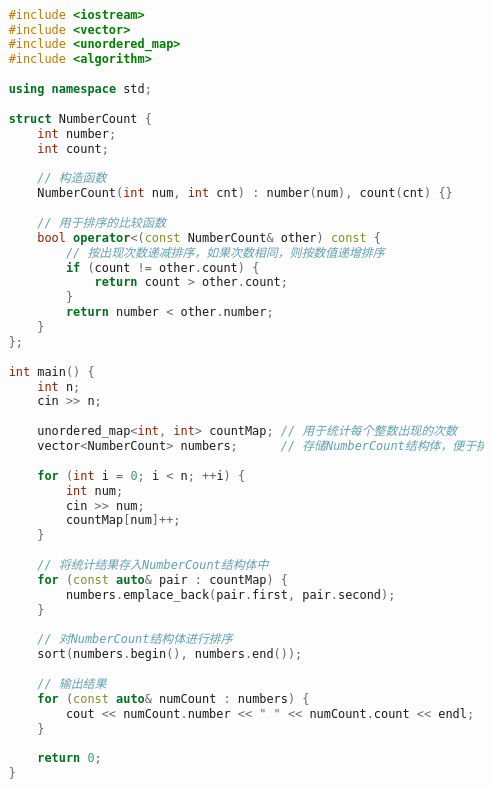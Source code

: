 \begin{lstlisting}[language=C++]

    #include <iostream>
    #include <vector>
    #include <unordered_map>
    #include <algorithm>
    
    using namespace std;
    
    struct NumberCount {
        int number;
        int count;
    
        // 构造函数
        NumberCount(int num, int cnt) : number(num), count(cnt) {}
    
        // 用于排序的比较函数
        bool operator<(const NumberCount& other) const {
            // 按出现次数递减排序，如果次数相同，则按数值递增排序
            if (count != other.count) {
                return count > other.count;
            }
            return number < other.number;
        }
    };
    
    int main() {
        int n;
        cin >> n;
    
        unordered_map<int, int> countMap; // 用于统计每个整数出现的次数
        vector<NumberCount> numbers;      // 存储NumberCount结构体，便于排序
    
        for (int i = 0; i < n; ++i) {
            int num;
            cin >> num;
            countMap[num]++;
        }
    
        // 将统计结果存入NumberCount结构体中
        for (const auto& pair : countMap) {
            numbers.emplace_back(pair.first, pair.second);
        }
    
        // 对NumberCount结构体进行排序
        sort(numbers.begin(), numbers.end());
    
        // 输出结果
        for (const auto& numCount : numbers) {
            cout << numCount.number << " " << numCount.count << endl;
        }
    
        return 0;
    }    

\end{lstlisting}
